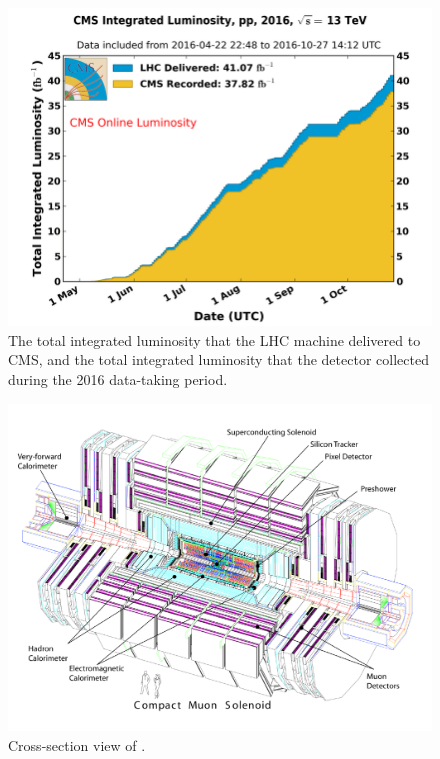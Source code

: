 \begin{figure}
  \centering
  \includegraphics[width=\textwidth]{figs/CMSLUMI.png}
  \caption{The total integrated luminosity that the LHC machine delivered to CMS, and the total integrated luminosity that the detector collected during the 2016 data-taking period.}
  \label{fig:CMSlumi}
\end{figure}

\begin{figure}
  \begin{center}
  \includegraphics[width=0.8\textheight]{figs/CMScrosssection.pdf}
  \caption[Cross-section view of \CMS]%
    {Cross-section view of \CMS.}
  \label{fig:CMSCrossSection}
  \end{center}
\end{figure}

